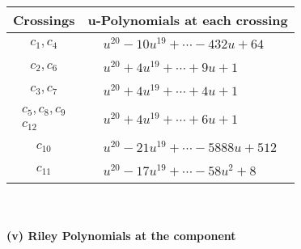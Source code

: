 \documentclass[1p]{elsarticle_modified}
\theoremstyle{definition}
\begin{document}
\begin{tabular}{m{50pt}|m{274pt}}
Crossings & \hspace{64pt}u-Polynomials at each crossing \\
\hline $$\begin{aligned}c_{1},c_{4}\end{aligned}$$&$\begin{aligned}
&u^{20}-10 u^{19}+\cdots-432 u+64
\end{aligned}$\\
\hline $$\begin{aligned}c_{2},c_{6}\end{aligned}$$&$\begin{aligned}
&u^{20}+4 u^{19}+\cdots+9 u+1
\end{aligned}$\\
\hline $$\begin{aligned}c_{3},c_{7}\end{aligned}$$&$\begin{aligned}
&u^{20}+4 u^{19}+\cdots+4 u+1
\end{aligned}$\\
\hline $$\begin{aligned}c_{5},c_{8},c_{9}\\c_{12}\end{aligned}$$&$\begin{aligned}
&u^{20}+4 u^{19}+\cdots+6 u+1
\end{aligned}$\\
\hline $$\begin{aligned}c_{10}\end{aligned}$$&$\begin{aligned}
&u^{20}-21 u^{19}+\cdots-5888 u+512
\end{aligned}$\\
\hline $$\begin{aligned}c_{11}\end{aligned}$$&$\begin{aligned}
&u^{20}-17 u^{19}+\cdots-58 u^2+8
\end{aligned}$\\
\hline
\end{tabular}\\~\\
\newpage\renewcommand{\arraystretch}{1}
\flushleft \textbf{(v) Riley Polynomials at the component}\newline \\
\end{document}
